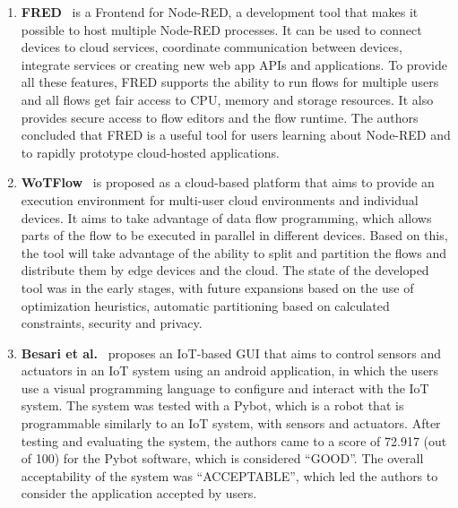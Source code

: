 \begin{enumerate}
    \item \textbf{FRED}~\cite{fred} is a Frontend for Node-RED, a development tool that makes it possible to host multiple Node-RED processes. It can be used to connect devices to cloud services, coordinate communication between devices, integrate services or creating new web app APIs and applications. To provide all these features, FRED supports the ability to run flows for multiple users and all flows get fair access to CPU, memory and storage resources. It also provides secure access to flow editors and the flow runtime. The authors concluded that FRED is a useful tool for users learning about Node-RED and to rapidly prototype cloud-hosted applications.
    \item \textbf{WoTFlow}~\cite{wotflow_dnr} is proposed as a cloud-based platform that aims to provide an execution environment for multi-user cloud environments and individual devices. It aims to take advantage of data flow programming, which allows parts of the flow to be executed in parallel in different devices. Based on this, the tool will take advantage of the ability to split and partition the flows and distribute them by edge devices and the cloud. The state of the developed tool was in the early stages, with future expansions based on the use of optimization heuristics, automatic partitioning based on calculated constraints, security and privacy.
    \item \textbf{Besari et al.}~\cite{mobile_apps_rpi} \cite{pre_mobile_apps_rpi} proposes an IoT-based GUI that aims to control sensors and actuators in an IoT system using an android application, in which the users use a visual programming language to configure and interact with the IoT system. The system was tested with a Pybot, which is a robot that is programmable similarly to an IoT system, with sensors and actuators. After testing and evaluating the system, the authors came to a score of 72.917 (out of 100) for the Pybot software, which is considered “GOOD”. The overall acceptability of the system was “ACCEPTABLE”, which led the authors to consider the application accepted by users.

\end{enumerate}
